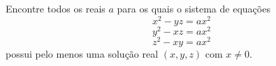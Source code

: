 Encontre todos os reais $a$ para os quais o sistema de equações
$$ x^2 - yz = ax^2 $$
$$ y^2 - xz = ax^2 $$
$$ z^2 - xy = ax^2 $$
possui pelo menos uma solução real $(x, y, z)$ com $x \neq 0$.
